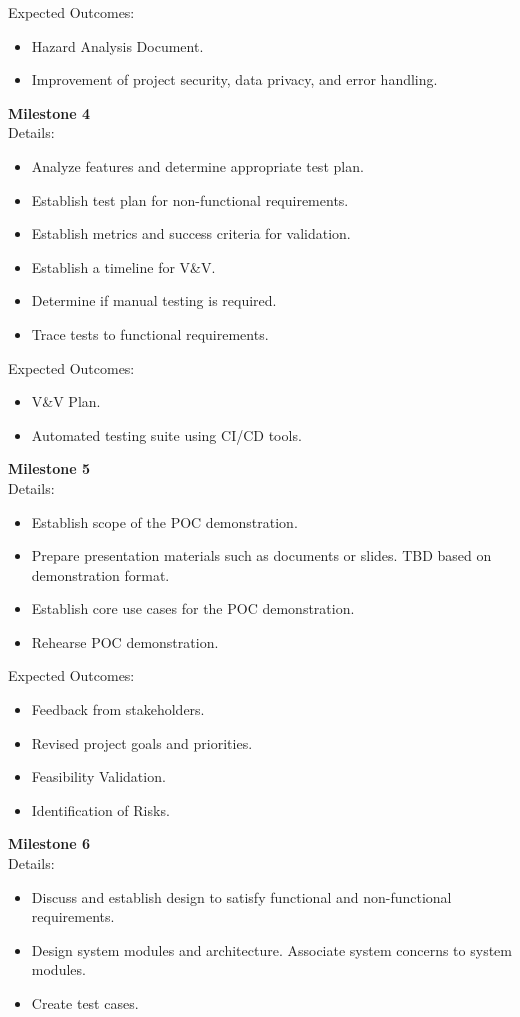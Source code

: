 \documentclass{scrreprt}
\theoremstyle{definition}
\begin{document}
Expected Outcomes:
\begin{itemize}
\item Hazard Analysis Document.
\item Improvement of project security, data privacy, and error handling.
\end{itemize}
\textbf{Milestone 4}\\
Details:
\begin{itemize}
\item Analyze features and determine appropriate test plan.
\item Establish test plan for non-functional requirements.
\item Establish metrics and success criteria for validation.
\item Establish a timeline for V\&V.
\item Determine if manual testing is required.
\item Trace tests to functional requirements.
\end{itemize}
Expected Outcomes:
\begin{itemize}
\item V\&V Plan.
\item Automated testing suite using CI/CD tools.
\end{itemize}
\textbf{Milestone 5}\\
Details:
\begin{itemize}
\item Establish scope of the POC demonstration.
\item Prepare presentation materials such as documents or slides. TBD based on demonstration format.
\item Establish core use cases for the POC demonstration.
\item Rehearse POC demonstration.
\end{itemize}
Expected Outcomes:
\begin{itemize}
\item Feedback from stakeholders.
\item Revised project goals and priorities.
\item Feasibility Validation.
\item Identification of Risks.
\end{itemize}
\textbf{Milestone 6}\\
Details:
\begin{itemize}
\item Discuss and establish design to satisfy functional and non-functional requirements.
\item Design system modules and architecture. Associate system concerns to system modules.
\item Create test cases.
\end{itemize}
\end{document}
